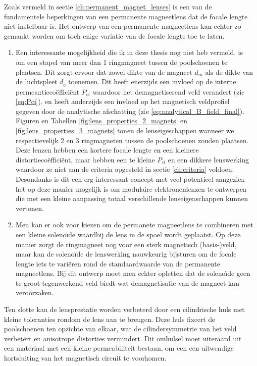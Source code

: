 \documentclass[we,twoside,openright,a4paper,11pt]{uantwerpenbamathesis}
\begin{document}
Zoals vermeld in sectie \ref{ch:permanent_magnet_lenses} is een van de fundamentele beperkingen van een permanente magneetlens dat de focale lengte niet instelbaar is. Het ontwerp van een permanente magneetlens kan echter zo gemaakt worden om toch enige variatie van de focale lengte toe te laten.
\begin{enumerate}
    \item Een interessante mogelijkheid die ik in deze thesis nog niet heb vermeld, is om een stapel van meer dan 1 ringmagneet tussen de poolschoenen te plaatsen. Dit zorgt ervoor dat zowel dikte van de magneet $d_m$ als de dikte van de luchtspleet $d_g$ toenemen. Dit heeft enerzijds een invloed op de interne permeantiecoëfficiënt $P_{ci}$ waardoor het demagnetiserend veld verandert (zie \ref{eq:Pci}), en heeft anderzijds een invloed op het magnetisch veldprofiel gegeven door de analytische afschatting (zie \ref{eq:analytical_B_field_final}). Figuren en Tabellen \ref{fig:lens_properties_2_magnets} en \ref{fig:lens_properties_3_magnets} tonen de lenseigeschappen wanneer we respectievelijk 2 en 3 ringmagneten tussen de poolschoenen zouden plaatsen.\\
    
    Deze lenzen hebben een kortere focale lengte en een kleinere distortiecoëfficiënt, maar hebben een te kleine $P_{ci}$ en een dikkere lenswerking waardoor ze niet aan de criteria opgesteld in sectie \ref{ch:criteria} voldoen. Desondanks is dit een erg interessant concept met veel potentieel aangezien het op deze manier mogelijk is om modulaire elektronenlenzen te ontwerpen die met een kleine aanpassing totaal verschillende lenseigenschappen kunnen vertonen. 
    \item Men kan er ook voor kiezen om de permanete magneetlens te combineren met een kleine solenoïde waardbij de lens in de spoel wordt geplaatst. Op deze manier zorgt de ringmagneet nog voor een sterk magnetisch (basis-)veld, maar kan de solenoïde de lenswerking nauwkeurig bijsturen om de focale lengte iets te variëren rond de standaardwaarde van de permanente magneetlens. Bij dit ontwerp moet men echter opletten dat de solenoïde geen te groot tegenwerkend veld biedt wat demagnetisatie van de magneet kan veroorzaken.
\end{enumerate}

Ten slotte kan de lensprestatie worden verbeterd door een cilindrische huls met kleine toleranties rondom de lens aan te brengen. Deze huls fixeert de poolschoenen ten opzichte van elkaar, wat de cilindersymmetrie van het veld verbetert en anisotrope distorties vermindert. Dit omhulsel moet uiteraard uit een materiaal met een kleine permeabiliteit bestaan, om een een uitwendige kortsluiting van het magnetisch circuit te voorkomen.\\
\end{document}
